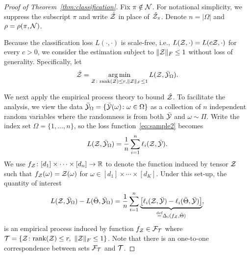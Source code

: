 \documentclass[11pt]{article}
\theoremstyle{plain}
\theoremstyle{definition}
\newcommand*{\KeepStyleUnderBrace}[1]{%
  \mathop{%
    \mathchoice
    {\underbrace{\displaystyle#1}}%
    {\underbrace{\textstyle#1}}%
    {\underbrace{\scriptstyle#1}}%
    {\underbrace{\scriptscriptstyle#1}}%
  }\limits
}
\def\rank{\textup{rank}}
\begin{document}
\begin{proof}[Proof of Theorem~\ref{thm:classification}]
Fix $\pi\notin\mathcal{N}$. For notational simplicity, we suppress the subscript $\pi$ and write $\hat {\mathcal{Z}}$ in place of $\hat {\mathcal{Z}}_\pi$. Denote $n=|\Omega|$ and $\rho=\rho(\pi, \mathcal{N})$. 

Because the classification loss $L(\cdot, \cdot)$ is scale-free, i.e., $L(\mathcal{Z},\cdot)=L(c\mathcal{Z}, \cdot)$ for every $c>0$, we consider the estimation subject to $\lVert\mathcal{Z}\rVert_F\leq 1$ without loss of generality. Specifically, let
\begin{align}\label{eq:opt}
\hat {\mathcal{Z}}=\operatorname*{arg\,min}_{\mathcal{Z}\colon \textup{rank}(\mathcal{Z})\leq r, \lVert\mathcal{Z}\rVert_F\leq 1}L(\mathcal{Z}, \bar {\mathcal{Y}}_{\Omega}).
\end{align}

We next apply the empirical process theory to bound $\hat {\mathcal{Z}}$. To facilitate the analysis, we view the data $\bar {\mathcal{Y}}_\Omega=\{\bar {\mathcal{Y}}(\omega)\colon \omega\in \Omega\}$ as a collection of $n$ independent random variables where the randomness is from both $\bar {\mathcal{Y}}$ and $\omega\sim\Pi$. Write the index set $\Omega=\{1,\ldots,n\}$, so the loss function~\eqref{eq:sample2} becomes
\[
L(\mathcal{Z},\bar {\mathcal{Y}}_\Omega)={1\over n}\sum_{i=1}^n\ell_{i}(\mathcal{Z}, \bar {\mathcal{Y}}).
\]
We use $f_{\mathcal{Z}} \colon [d_1]\times\cdots\times[d_n] \to \mathbb{R}$ to denote the function induced by tensor $\mathcal{Z}$ such that $f_{\mathcal{Z}}(\omega)=\mathcal{Z}(\omega)$ for $\omega\in[d_1]\times \cdots \times [d_K]$. Under this set-up, the quantity of interest
\begin{align}\label{eq:empirical}
 L(\tZ,\bar \tY_\Omega)-L(\bar \Theta,\bar \tY_\Omega)={1\over n}\sum_{i=1}^n \KeepStyleUnderBrace{\left[\ell_{i}(\tZ, \bar \tY)-\ell_{i}(\bar \Theta, \bar \tY)\right]}_{\stackrel{\text{def}}{=}\Delta_i(f_\tZ,\bar \Theta)},
\end{align}
is an empirical process induced by function $f_{\mathcal{Z}}\in \mathcal{F}_{\mathcal{T}}$ where $\tT=\{\tZ\colon \rank(\tZ)\leq r, \ \FnormSize{}{\tZ}\leq 1\}$. Note that there is an one-to-one correspondence between sets $\mathcal{F}_{\mathcal{T}}$ and $\mathcal{T}$. 


\end{proof}
\end{document}
